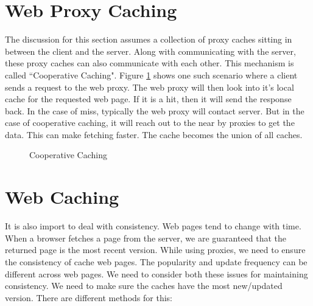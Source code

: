 \documentclass[twoside]{article}
\begin{document}
\section{Web Proxy Caching}
The discussion for this section assumes a collection of proxy caches sitting in between the client and the server. Along with communicating with the server, these proxy caches can also communicate with each other. This mechanism is called ``Cooperative Caching". Figure \ref{coop_cache} shows one such scenario where a client sends a request to the web proxy. The web proxy will then look into it's local cache for the requested web page. If it is a hit, then it will send the response back. In the case of miss, typically the web proxy will contact server. But in the case of cooperative caching, it will reach out to the near by proxies to get the data. This can make fetching faster. The cache becomes the union of all caches.
\begin{figure}[h]
\begin{center}
\caption{Cooperative Caching}
\label{coop_cache}
\end{center}
\end{figure}
\section{Web Caching}
It is also import to deal with consistency. Web pages tend to change with time. When a browser fetches a page from the server, we are guaranteed that the returned page is the most recent version. While using proxies, we need to ensure the consistency of cache web pages. The popularity and update frequency can be different across web pages. We need to consider both these issues for maintaining consistency. We need to make sure the caches have the most new/updated version. There are different methods for this:
\end{document}
